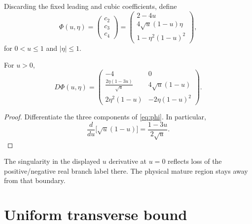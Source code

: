 \documentclass[12pt]{article}
\theoremstyle{remark}\newtheorem{remark}[theorem]{Remark}
\begin{document}
Discarding the fixed leading and cubic coefficients, define
\begin{equation}\label{eq:phi}
 \Phi(u,\eta)=
 \begin{pmatrix}
 c_2\\c_3\\c_4
 \end{pmatrix}
 =\begin{pmatrix}
 2-4u\\
 4\sqrt u(1-u)\eta\\
 1-\eta^2(1-u)^2
 \end{pmatrix},
\end{equation}
for $0<u\le1$ and $|\eta|\le1$.

\begin{proposition}\label{prop:jacobian}
For $u>0$,
\begin{equation}\label{eq:jacobian}
 D\Phi(u,\eta)=
 \begin{pmatrix}
 -4 & 0\\[2mm]
 \displaystyle\frac{2\eta(1-3u)}{\sqrt u}
     &4\sqrt u(1-u)\\[3mm]
 2\eta^2(1-u)&-2\eta(1-u)^2
 \end{pmatrix}.
\end{equation}
\end{proposition}
\begin{proof}
Differentiate the three components of \eqref{eq:phi}.  In particular,
\begin{equation}
 \frac{d}{du}\bigl[\sqrt u(1-u)\bigr]
 =\frac{1-3u}{2\sqrt u}.
\end{equation}
\end{proof}

The singularity in the displayed $u$ derivative at $u=0$ reflects loss of
the positive/negative real branch label there.  The physical mature region
stays away from that boundary.

\section{Uniform transverse bound}
\end{document}
